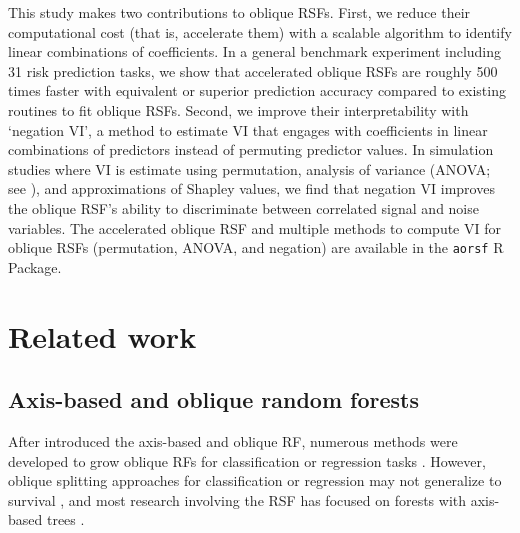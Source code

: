 \documentclass[twoside,11pt]{article}\usepackage[]{graphicx}\usepackage[]{xcolor}
\newcommand{\ie}{that is}
\newcommand{\eg}{for example}
\begin{document}
This study makes two contributions to oblique RSFs. First, we reduce their computational cost (\ie, accelerate them) with a scalable algorithm to identify linear combinations of coefficients. In a general benchmark experiment including 31 risk prediction tasks, we show that accelerated oblique RSFs are roughly 500 times faster with equivalent or superior prediction accuracy compared to existing routines to fit oblique RSFs. Second, we improve their interpretability with `negation VI', a method to estimate VI that engages with coefficients in linear combinations of predictors instead of permuting predictor values. In simulation studies where VI is estimate using permutation, analysis of variance (ANOVA; see \citet{menze2011oblique}), and approximations of Shapley values, we find that negation VI improves the oblique RSF's ability to discriminate between correlated signal and noise variables. The accelerated oblique RSF and multiple methods to compute VI for oblique RSFs (permutation, ANOVA, and negation) are available in the \texttt{aorsf} R Package.






\section{Related work}

\subsection{Axis-based and oblique random forests}

After \citet{breiman2001random} introduced the axis-based and oblique RF, numerous methods were developed to grow oblique RFs for classification or regression tasks \citep{menze2011oblique, zhang2014oblique, rainforth2015canonical, zhu2015reinforcement, poona2016investigating, qiu2017oblique, tomita2020sparse, katuwal2020heterogeneous}. However, oblique splitting approaches for classification or regression may not generalize to survival \citep[\eg, see][Section~4.5.1]{zhu2013tree}, and most research involving the RSF has focused on forests with axis-based trees \citep{wang2017selective}.
\end{document}
